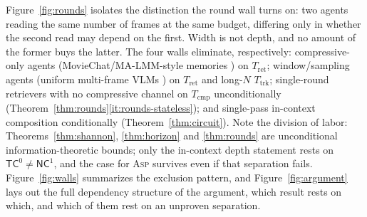 \documentclass[10pt]{article}
\theoremstyle{definition}
\theoremstyle{plain}
\newcommand{\ASP}{\textsc{Asp}}
\begin{document}
Figure~\ref{fig:rounds} isolates the distinction the round wall turns on: two agents reading the same number of frames at the same budget, differing only in whether the second read may depend on the first. Width is not depth, and no amount of the former buys the latter. The four walls eliminate, respectively: compressive-only agents (MovieChat/MA-LMM-style memories \citep{moviechat,malmm}) on $T_{\mathrm{ret}}$; window/sampling agents (uniform multi-frame VLMs \citep{openeqa}) on $T_{\mathrm{ret}}$ and long-$N$ $T_{\mathrm{trk}}$; single-round retrievers with no compressive channel on $T_{\mathrm{cmp}}$ unconditionally (Theorem~\ref{thm:rounds}\ref{it:rounds-stateless}); and single-pass in-context composition conditionally (Theorem~\ref{thm:circuit}). Note the division of labor: Theorems~\ref{thm:shannon}, \ref{thm:horizon} and \ref{thm:rounds} are unconditional information-theoretic bounds; only the in-context depth statement rests on $\mathsf{TC}^0\neq\mathsf{NC}^1$, and the case for \ASP{} survives even if that separation fails. Figure~\ref{fig:walls} summarizes the exclusion pattern, and Figure~\ref{fig:argument} lays out the full dependency structure of the argument, which result rests on which, and which of them rest on an unproven separation.
\end{document}

